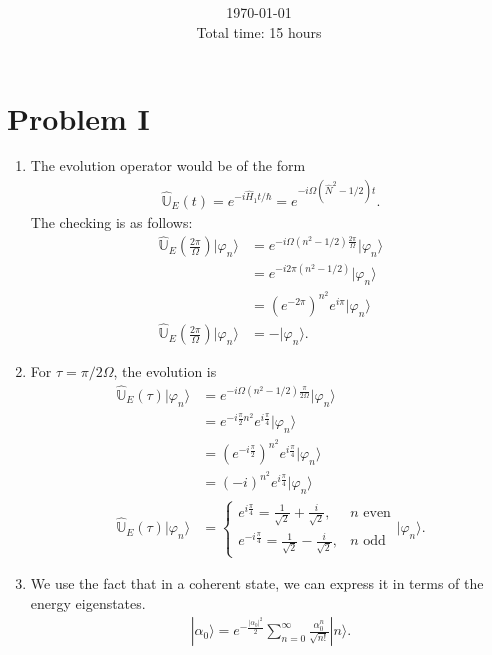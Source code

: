 \documentclass[letterpaper,11pt,twoside]{article}
\title{\textbf{\assignment}\\\course\\{\Large\institution}}
\author{\autor}
\date{\today\\Total time: 15 hours}
\newcommand{\ket}[1]{|#1\rangle}
\begin{document}
\pagestyle{mainstyle}
\maketitle
\section*{Problem I}
\begin{enumerate}[itemsep=0pt,topsep=0pt,label=\alph*)]
  \item The evolution operator would be of the form 
  \begin{align*}
    \hat{\mathbb{U}}_E(t)=e^{-i\hat{H}_1t/\hbar}=e^{-i\Omega(\hat{N}^2-1/2)t}.
  \end{align*}
  The checking is as follows:
  \begin{align*}
    \hat{\mathbb{U}}_E(\frac{2\pi}{\Omega})\ket{\varphi_n}&=e^{-i\Omega(n^2-1/2)\frac{2\pi}{\Omega}}\ket{\varphi_n}\\
    &=e^{-i2\pi(n^2-1/2)}\ket{\varphi_n}\\
    &=(e^{-2\pi})^{n^2}e^{i\pi}\ket{\varphi_n}\\
    \hat{\mathbb{U}}_E(\frac{2\pi}{\Omega})\ket{\varphi_n}&=-\ket{\varphi_n}.
  \end{align*}
  \item For $\tau=\pi/2\Omega$, the evolution is 
  \begin{align*}
    \hat{\mathbb{U}}_E(\tau)\ket{\varphi_n}&=e^{-i\Omega(n^2-1/2)\frac{\pi}{2\Omega}}\ket{\varphi_n}\\
    &=e^{-i\frac{\pi}{2}n^2}e^{i\frac{\pi}{4}}\ket{\varphi_n}\\
    &=(e^{-i\frac{\pi}{2}})^{n^2}e^{i\frac{\pi}{4}}\ket{\varphi_n}\\
    &=(-i)^{n^2}e^{i\frac{\pi}{4}}\ket{\varphi_n}\\
   \hat{\mathbb{U}}_E(\tau)\ket{\varphi_n}&=\begin{cases}
      e^{i\frac{\pi}{4}}=\frac{1}{\sqrt{2}}+\frac{i}{\sqrt{2}},&\text{$n$ even}\\
      e^{-i\frac{\pi}{4}}=\frac{1}{\sqrt{2}}-\frac{i}{\sqrt{2}},&\text{$n$ odd}
    \end{cases}\ket{\varphi_n}.
  \end{align*}
  \item We use the fact that in a coherent state, we can express it in terms of the energy eigenstates.
  \begin{align*}
    \ket{\alpha_0}=e^{-\frac{|\alpha_0|^2}{2}}\sum_{n=0}^\infty\frac{\alpha_0^n}{\sqrt{n!}}\ket{n}.

\end{align*}
\end{enumerate}
\end{document}
